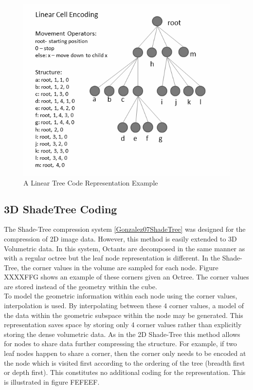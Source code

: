 \begin{figure}[!htb]
\centering
\includegraphics[width=12cm]{images/ch2/LinearCellCodeRepresentation}
\caption{A Linear Tree Code Representation Example}
\label{LinearCellCodeRepresentation}
\end{figure}



\subsection{3D ShadeTree Coding}

\label{sec:dr:coding}

The Shade-Tree compression system \ref{Gonzalez07ShadeTree} was designed for the compression of 2D image data. However, this method is easily extended to 3D Volumetric data. In this system, Octants are decomposed in the same manner as with a regular octree but the leaf node representation is different. In the Shade-Tree, the corner values in the volume are sampled for each node. Figure XXXXFFG shows an example of these corners given an Octree. The corner values are stored instead of the geometry within the cube. \\


To model the geometric information within each node using the corner values, interpolation is used. By interpolating between these 4 corner values, a model of the data within the geometric subspace within the node may be generated. This representation saves space by storing only 4 corner values rather than explicitly storing the dense volumetric data. As in the 2D Shade-Tree this method allows for nodes to share data further compressing the structure. For example, if two leaf nodes happen to share a corner, then the corner only needs to be encoded at the node which is visited first according to the ordering of the tree (breadth first or depth first). This constitutes no additional coding for the representation. This is illustrated in figure FEFEEF. \\

